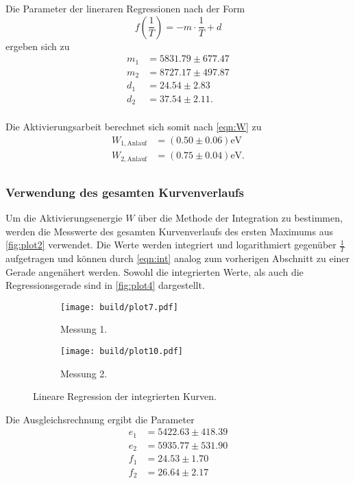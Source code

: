 Die Parameter der lineraren Regressionen nach der Form
\begin{equation}
  f(\frac{1}{T})= -m\cdot \frac{1}{T} +d
\end{equation}
ergeben sich zu
\begin{align*}
  m_1 &= 5831.79 \pm 677.47 \\
  m_2 &= 8727.17 \pm 497.87\\
  d_1 &= 24.54 \pm 2.83\\
  d_2 &= 37.54 \pm 2.11.\\
\end{align*}

Die Aktivierungsarbeit berechnet sich somit nach \autoref{eqn:W} zu
\begin{align*}
  W_{1,\text{Anlauf}} &= (0.50 \pm 0.06) \unit{\electronvolt}\\
  W_{2,\text{Anlauf}} &= (0.75 \pm 0.04) \unit{\electronvolt}.\\
\end{align*} 

\subsubsection{Verwendung des gesamten Kurvenverlaufs}

Um die Aktivierungsenergie $W$ über die Methode der Integration zu bestimmen, werden die Messwerte des gesamten Kurvenverlaufs des ersten 
Maximums aus \autoref{fig:plot2} verwendet.
Die Werte werden integriert und logarithmiert gegenüber $\frac{1}{T}$ aufgetragen und können durch \autoref{eqn:int} analog zum vorherigen
Abschnitt zu einer Gerade angenähert werden.
Sowohl die integrierten Werte, als auch die Regressionsgerade sind in \autoref{fig:plot4} dargestellt.

\begin{figure}[H]
  \begin{subfigure}{\textwidth}
  \centering
  \texttt{[image: build/plot7.pdf]}
  \caption{Messung 1.}
  \label{fig:plot4a}
  \end{subfigure}
  \hfill
  \begin{subfigure}{\textwidth}
  \centering
  \texttt{[image: build/plot10.pdf]}
  \caption{Messung 2.}
  \label{fig:plot4b}
  \end{subfigure}
  \caption{Lineare Regression der integrierten Kurven.}
  \label{fig:plot4}
\end{figure}

Die Ausgleichsrechnung ergibt die Parameter
\begin{align*}
  e_1 &= 5422.63 \pm 418.39 \\
  e_2 &= 5935.77 \pm 531.90 \\
  f_1 &= 24.53 \pm 1.70 \\
  f_2 &= 26.64 \pm 2.17 \\
\end{align*}


